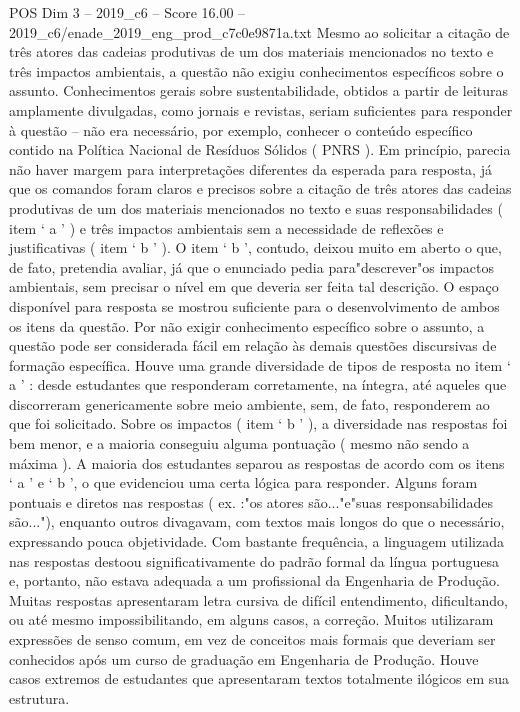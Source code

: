 \begin{textsample}{POS Dim 3 – 2019\_c6 – Score 16.00 – 2019\_c6/enade\_2019\_eng\_prod\_c7c0e9871a.txt}
Mesmo ao solicitar a citação de três atores das cadeias produtivas de um dos materiais mencionados no texto e três impactos ambientais, a questão não exigiu conhecimentos específicos sobre o assunto.
Conhecimentos gerais sobre sustentabilidade, obtidos a partir de leituras amplamente divulgadas, como jornais e revistas, seriam suficientes para responder à questão – não era necessário, por exemplo, conhecer o conteúdo específico contido na Política Nacional de Resíduos Sólidos ( PNRS ).
Em princípio, parecia não haver margem para interpretações diferentes da esperada para resposta, já que os comandos foram claros e precisos sobre a citação de três atores das cadeias produtivas de um dos materiais mencionados no texto e suas responsabilidades ( item ‘ a ’ ) e três impactos ambientais sem a necessidade de reflexões e justificativas ( item ‘ b ’ ).
O item ‘ b ’, contudo, deixou muito em aberto o que, de fato, pretendia avaliar, já que o enunciado pedia para"descrever"os impactos ambientais, sem precisar o nível em que deveria ser feita tal descrição.
O espaço disponível para resposta se mostrou suficiente para o desenvolvimento de ambos os itens da questão.
Por não exigir conhecimento específico sobre o assunto, a questão pode ser considerada fácil em relação às demais questões discursivas de formação específica.
Houve uma grande diversidade de tipos de resposta no item ‘ a ’ : desde estudantes que responderam corretamente, na íntegra, até aqueles que discorreram genericamente sobre meio ambiente, sem, de fato, responderem ao que foi solicitado.
Sobre os impactos ( item ‘ b ’ ), a diversidade nas respostas foi bem menor, e a maioria conseguiu alguma pontuação ( mesmo não sendo a máxima ).
A maioria dos estudantes separou as respostas de acordo com os itens ‘ a ’ e ‘ b ’, o que evidenciou uma certa lógica para responder.
Alguns foram pontuais e diretos nas respostas ( ex. :"os atores são..."e"suas responsabilidades são..."), enquanto outros divagavam, com textos mais longos do que o necessário, expressando pouca objetividade.
Com bastante frequência, a linguagem utilizada nas respostas destoou significativamente do padrão formal da língua portuguesa e, portanto, não estava adequada a um profissional da Engenharia de Produção.
Muitas respostas apresentaram letra cursiva de difícil entendimento, dificultando, ou até mesmo impossibilitando, em alguns casos, a correção.
Muitos utilizaram expressões de senso comum, em vez de conceitos mais formais que deveriam ser conhecidos após um curso de graduação em Engenharia de Produção.
Houve casos extremos de estudantes que apresentaram textos totalmente ilógicos em sua estrutura.

\end{textsample}
